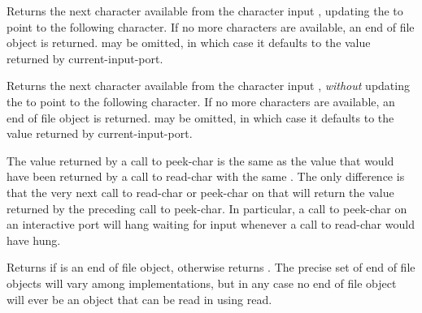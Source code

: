 \begin{entry}{%
}

Returns the next character available from the character input ,
updating
the  to point to the following character.  If no more characters
are available, an end of file object is returned.   may be
omitted, in which case it defaults to the value returned by {\cf current-input-port}.

\end{entry}


\begin{entry}{%
}

Returns the next character available from the character input ,
{\em without} updating
the  to point to the following character.  If no more characters
are available, an end of file object is returned.   may be
omitted, in which case it defaults to the value returned by {\cf current-input-port}.

\begin{note}
The value returned by a call to {\cf peek-char} is the same as the
value that would have been returned by a call to {\cf read-char} with the
same .  The only difference is that the very next call to
{\cf read-char} or {\cf peek-char} on that  will return the
value returned by the preceding call to {\cf peek-char}.  In particular, a call
to {\cf peek-char} on an interactive port will hang waiting for input
whenever a call to {\cf read-char} would have hung.
\end{note}

\end{entry}


\begin{entry}{%
}

Returns \schtrue{} if  is an end of file object, otherwise returns
\schfalse.  The precise set of end of file objects will vary among
implementations, but in any case no end of file object will ever be an object
that can be read in using {\cf read}.

\end{entry}


